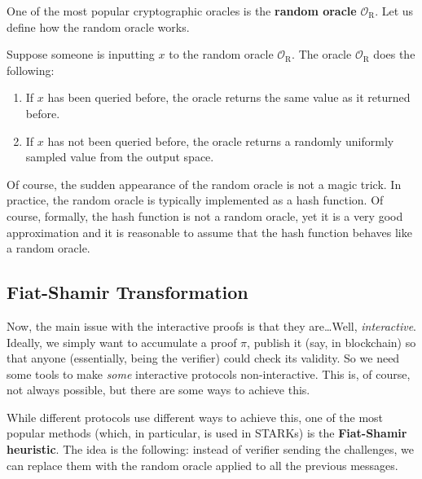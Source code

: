 \documentclass[../lecture-notes.tex]{subfiles}
\begin{document}
One of the most popular cryptographic oracles is the \textbf{random oracle} $\mathcal{O}_{\text{R}}$. Let us define how the random oracle works.

Suppose someone is inputting $x$ to the random oracle $\mathcal{O}_{\text{R}}$. The oracle $\mathcal{O}_{\text{R}}$ does the following:
\begin{enumerate}
    \item If $x$ has been queried before, the oracle returns the same value as it returned before.
    \item If $x$ has not been queried before, the oracle returns a randomly uniformly sampled value from the output space.
\end{enumerate}

\begin{remark}
    Of course, the sudden appearance of the random oracle is not a magic trick. In practice, the random oracle is typically implemented as a hash function. Of course, formally, the hash function is not a random oracle, yet it is a very good approximation and it is reasonable to assume that the hash function behaves like a random oracle.
\end{remark}

\subsection{Fiat-Shamir Transformation}

Now, the main issue with the interactive proofs is that they are\ldots Well, \textit{interactive}. Ideally, we simply want to accumulate a proof $\pi$, publish it (say, in blockchain) so that anyone (essentially, being the verifier) could check its validity. So we need some tools to make \textit{some} interactive protocols non-interactive. This is, of course, not always possible, but there are some ways to achieve this.

While different protocols use different ways to achieve this, one of the most popular methods (which, in particular, is used in STARKs) is the \textbf{Fiat-Shamir heuristic}. The idea is the following: instead of verifier sending the challenges, we can replace them with the random oracle applied to all the previous messages. 
\end{document}
